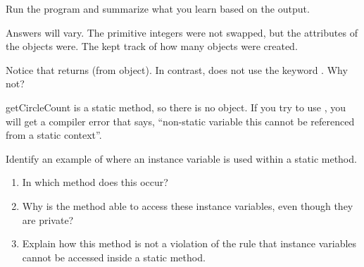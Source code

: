 %


\Q \label{summary}
Run the  program and summarize what you learn based on the output.

\begin{answer}
Answers will vary.
The primitive integers were not swapped, but the attributes of the  objects were.
The  kept track of how many objects were created.
\end{answer}


\Q Notice that  returns  (from  object).
In contrast,  does not use the keyword .
Why not?

\begin{answer}
getCircleCount is a static method, so there is no object.
If you try to use , you will get a compiler error that says, ``non-static variable this cannot be referenced from a static context''.
\end{answer}


\Q Identify an example of where an instance variable is used within a static method.

\begin{enumerate}
\item In which method does this occur? \\[2pt]

\item Why is the method able to access these instance variables, even though they are private? \\[2pt]

\item Explain how this method is not a violation of the rule that instance variables cannot be accessed inside a static method. \\[1ex]
\end{enumerate}
